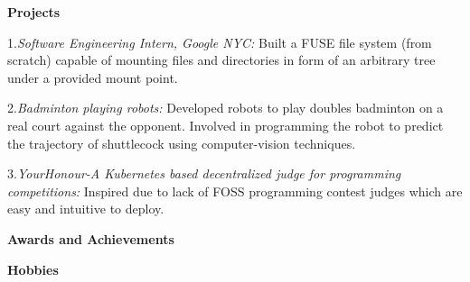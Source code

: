 \documentclass[a4paper, 11pt]{article}
\begin{document}
\noindent\textbf{Projects}

\vspace{2mm}
1.{\it Software Engineering Intern, Google NYC:} Built a FUSE file system (from scratch) capable of mounting files and directories in form of an arbitrary
tree under a provided mount point.

\vspace{1mm}

2.{\it Badminton playing robots:} Developed robots to play doubles badminton on a real court against the opponent.
 Involved in programming the robot to predict the trajectory of shuttlecock using computer-vision
techniques.
\vspace{1mm}

3.{\it YourHonour-A Kubernetes based decentralized judge for programming competitions:} Inspired due to lack of FOSS programming contest judges which are easy and intuitive to deploy.

\vspace{2mm}

\noindent\textbf{Awards and Achievements}

\vspace{3mm}


\vspace{2mm}

 \vspace{5mm}
 
 
 \noindent\textbf{Hobbies}

\vspace{1.5mm}


\vspace{1.5mm}

 
\end{document}
